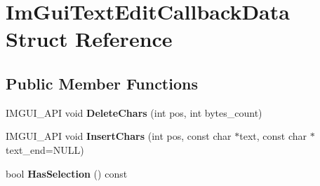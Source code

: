 \hypertarget{struct_im_gui_text_edit_callback_data}{}\section{Im\+Gui\+Text\+Edit\+Callback\+Data Struct Reference}
\label{struct_im_gui_text_edit_callback_data}
\subsection*{Public Member Functions}
\begin{DoxyCompactItemize}
\item 
\mbox{\label{struct_im_gui_text_edit_callback_data_aaa702107677f7da0e7ea61311ab69af0}} 
I\+M\+G\+U\+I\+\_\+\+A\+PI void {\bfseries Delete\+Chars} (int pos, int bytes\+\_\+count)
\item 
\mbox{\label{struct_im_gui_text_edit_callback_data_a78aa927e57bf5fb898ba5a168e9bcf63}} 
I\+M\+G\+U\+I\+\_\+\+A\+PI void {\bfseries Insert\+Chars} (int pos, const char $\ast$text, const char $\ast$text\+\_\+end=N\+U\+LL)
\item 
\mbox{\label{struct_im_gui_text_edit_callback_data_ac43cc964e6c1c829db3fdb71660ff604}} 
bool {\bfseries Has\+Selection} () const
\end{DoxyCompactItemize}
